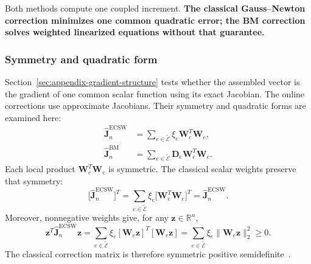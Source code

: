 \documentclass[a4paper,12pt]{article}
\newcommand{\vect}[1]{\boldsymbol{#1}}
\newcommand{\matr}[1]{\boldsymbol{#1}}
\begin{document}
Both methods compute one coupled increment. \textbf{The classical Gauss--Newton correction minimizes one common quadratic error; the BM correction solves weighted linearized equations without that guarantee.}

\subsubsection{Symmetry and quadratic form}
\label{sec:appendix-correction-symmetry}
\label{sec:appendix-correction-properties}
\label{sec:appendix-symmetric-part-growth}

Section~\ref{sec:appendix-gradient-structure} tests whether the assembled vector is the gradient of one common scalar function using its exact Jacobian. The online corrections use approximate Jacobians. Their symmetry and quadratic forms are examined here:
\begin{equation}
 \begin{aligned}
  \widehat{\matr{J}}_n^{\mathrm{ECSW}}
   &=\sum_{e\in\widetilde{\mathcal E}}\xi_e
       \matr{W}_e^T\matr{W}_e,\\
  \widehat{\matr{J}}_n^{\mathrm{BM}}
   &=\sum_{e\in\widetilde{\mathcal E}}\matr{D}_e
       \matr{W}_e^T\matr{W}_e.
 \end{aligned}
 \label{eq:appendix-correction-matrices}
\end{equation}
Each local product $\matr{W}_e^T\matr{W}_e$ is symmetric. The classical scalar weights preserve that symmetry:
\[
 \bigl[\widehat{\matr{J}}_n^{\mathrm{ECSW}}\bigr]^T
 =\sum_{e\in\widetilde{\mathcal E}}\xi_e
       \bigl[\matr{W}_e^T\matr{W}_e\bigr]^T
 =\widehat{\matr{J}}_n^{\mathrm{ECSW}}.
\]
Moreover, nonnegative weights give, for any $\vect{z}\in\mathbb R^n$,
\begin{equation}
 \vect{z}^T\widehat{\matr{J}}_n^{\mathrm{ECSW}}\vect{z}
 =\sum_{e\in\widetilde{\mathcal E}}\xi_e
       [\matr{W}_e\vect{z}]^T[\matr{W}_e\vect{z}]
 =\sum_{e\in\widetilde{\mathcal E}}\xi_e
       \|\matr{W}_e\vect{z}\|_2^2\geq0.
 \label{eq:appendix-classical-correction-psd}
\end{equation}
The classical correction matrix is therefore symmetric positive semidefinite~\cite{grimberg2021mesh}.
\end{document}
